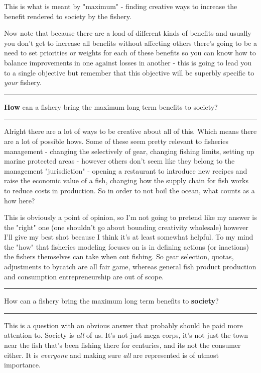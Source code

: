\documentclass[11pt,a5paper]{book}
\begin{document}
This is what is meant by "maximum" - finding creative ways to increase the benefit rendered to society by the fishery. 
\newline

Now note that because there are a load of different kinds of benefits and usually you don't get to increase all benefits without affecting others there's going to be a need to set priorities or weights for each of these benefits so you can know how to balance improvements in one against losses in another - this is going to lead you to a single objective but remember that this objective will be superbly specific to \textit{your} fishery.
\newpage

\noindent \rule{\textwidth}{0.5pt} 
\noindent \textbf{How} can a fishery bring the maximum long term benefits to society?
\newline
\rule{\textwidth}{0.5pt} 
\vspace{5pt}

Alright there are a lot of ways to be creative about all of this. Which means there are a lot of possible hows. Some of these seem pretty relevant to fisheries management - changing the selectively of gear, changing fishing limits, setting up marine protected areas - however others don't seem like they belong to the management "jurisdiction" - opening a restaurant to introduce new recipes and raise the economic value of a fish, changing how the supply chain for fish works to reduce costs in production. So in order to not boil the ocean, what counts as a how here?
\newline

This is obviously a point of opinion, so I'm not going to pretend like my answer is the "right" one (one shouldn't go about bounding creativity wholesale) however I'll give my best shot because I think it's at least somewhat helpful. To my mind the "how" that fisheries modeling focuses on is in defining actions (or inactions) the fishers themselves can take when out fishing. So gear selection, quotas, adjustments to bycatch are all fair game, whereas general fish product production and consumption entrepreneurship are out of scope. 
\newpage

\noindent \rule{\textwidth}{0.5pt} 
\noindent  How can a fishery bring the maximum long term benefits to \textbf{society}?
\newline
\rule{\textwidth}{0.5pt} 
\vspace{5pt}

This is a question with an obvious answer that probably should be paid more attention to. Society is \textit{all} of us. It's not just mega-corps, it's not just the town near the fish that's been fishing there for centuries, and its not the consumer either. It is \textit{everyone} and making sure \textit{all} are represented is of utmost importance. 
\newpage
\end{document}
